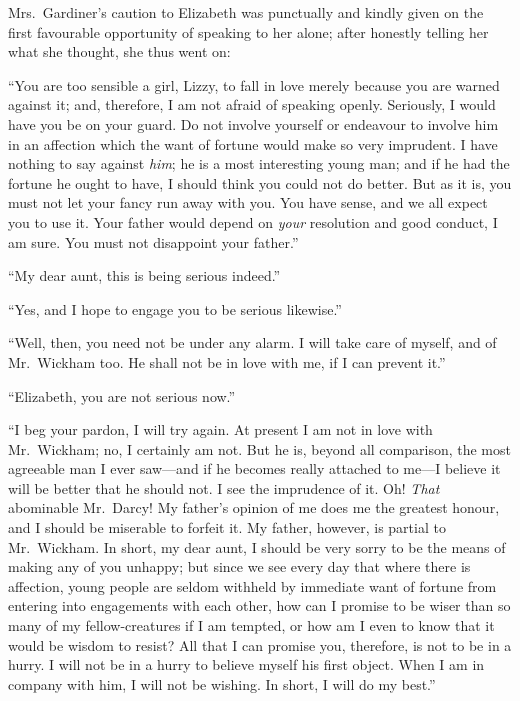 \documentclass[12pt,english,oneside]{book}
\begin{document}


Mrs.\ Gardiner's caution to Elizabeth was punctually and kindly given
on the first favourable opportunity of speaking to her alone; after
honestly telling her what she thought, she thus went on:

{}``You are too sensible a girl, Lizzy, to fall in love merely because
you are warned against it; and, therefore, I am not afraid of speaking
openly. Seriously, I would have you be on your guard. Do not involve
yourself or endeavour to involve him in an affection which the want
of fortune would make so very imprudent. I have nothing to say against
\textit{him}; he is a most interesting young man; and if he had the
fortune he ought to have, I should think you could not do better.
But as it is, you must not let your fancy run away with you. You have
sense, and we all expect you to use it. Your father would depend on
\textit{your} resolution and good conduct, I am sure. You must not
disappoint your father.''

{}``My dear aunt, this is being serious indeed.''

{}``Yes, and I hope to engage you to be serious likewise.''

{}``Well, then, you need not be under any alarm. I will take care
of myself, and of Mr.\ Wickham too. He shall not be in love with
me, if I can prevent it.''

{}``Elizabeth, you are not serious now.''

{}``I beg your pardon, I will try again. At present I am not in love
with Mr.\ Wickham; no, I certainly am not. But he is, beyond all
comparison, the most agreeable man I ever saw\mbox{---}and if he
becomes really attached to me\mbox{---}I believe it will be better
that he should not. I see the imprudence of it. Oh! \textit{That}
abominable Mr.\ Darcy! My father's opinion of me does me the greatest
honour, and I should be miserable to forfeit it. My father, however,
is partial to Mr.\ Wickham. In short, my dear aunt, I should be very
sorry to be the means of making any of you unhappy; but since we see
every day that where there is affection, young people are seldom withheld
by immediate want of fortune from entering into engagements with each
other, how can I promise to be wiser than so many of my fellow-creatures
if I am tempted, or how am I even to know that it would be wisdom
to resist? All that I can promise you, therefore, is not to be in
a hurry. I will not be in a hurry to believe myself his first object.
When I am in company with him, I will not be wishing. In short, I
will do my best.''
\end{document}
